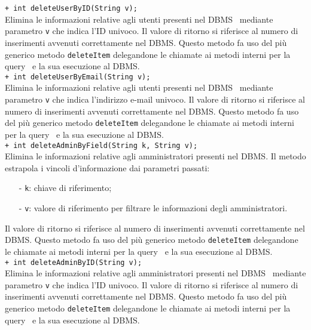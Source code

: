 {\begin{sloppypar}
{{{{\begin{itemize}
{				\texttt{+ int deleteUserByID(String v);}\\
				Elimina le informazioni relative agli utenti presenti nel DBMS\g~ mediante parametro \texttt{v} che indica l'ID univoco.
				Il valore  di ritorno si riferisce al numero di inserimenti avvenuti correttamente nel DBMS\g.
				Questo metodo fa uso del più generico metodo \texttt{deleteItem} delegandone le chiamate ai metodi interni per la query\g~ e la sua esecuzione al DBMS\g.\\
				
				\texttt{+ int deleteUserByEmail(String v);}\\
				Elimina le informazioni relative agli utenti presenti nel DBMS\g~ mediante parametro \texttt{v} che indica l'indirizzo e-mail univoco.
				Il valore  di ritorno si riferisce al numero di inserimenti avvenuti correttamente nel DBMS\g.
				Questo metodo fa uso del più generico metodo \texttt{deleteItem} delegandone le chiamate ai metodi interni per la query\g~ e la sua esecuzione al DBMS\g.\\
				
				\texttt{+ int deleteAdminByField(String k, String v);}\\
				Elimina le informazioni relative agli amministratori presenti nel DBMS\g.
				Il metodo estrapola i vincoli d'informazione dai parametri passati:
				\begin{itemize}
					\item[-] \texttt{k}: chiave di riferimento;
					\item[-] \texttt{v}: valore di riferimento per filtrare le informazioni degli amministratori.
				\end{itemize}
				Il valore  di ritorno si riferisce al numero di inserimenti avvenuti correttamente nel DBMS\g.
				Questo metodo fa uso del più generico metodo \texttt{deleteItem} delegandone le chiamate ai metodi interni per la query\g~ e la sua esecuzione al DBMS\g.\\
				
				\texttt{+ int deleteAdminByID(String v);}\\
				Elimina le informazioni relative agli amministratori presenti nel DBMS\g~ mediante parametro \texttt{v} che indica l'ID univoco.
				Il valore  di ritorno si riferisce al numero di inserimenti avvenuti correttamente nel DBMS\g.
				Questo metodo fa uso del più generico metodo \texttt{deleteItem} delegandone le chiamate ai metodi interni per la query\g~ e la sua esecuzione al DBMS\g.\\
				
}
\end{itemize}}}}}
\end{sloppypar}}
